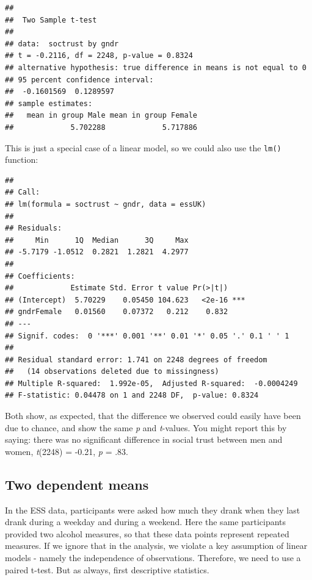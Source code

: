 \documentclass[
]{book}
\newenvironment{Shaded}{\begin{snugshade}}{\end{snugshade}}
\newcommand{\DataTypeTok}[1]{\textcolor[rgb]{0.13,0.29,0.53}{#1}}
\newcommand{\KeywordTok}[1]{\textcolor[rgb]{0.13,0.29,0.53}{\textbf{#1}}}
\newcommand{\NormalTok}[1]{#1}
\newcommand{\OperatorTok}[1]{\textcolor[rgb]{0.81,0.36,0.00}{\textbf{#1}}}
\newcommand{\StringTok}[1]{\textcolor[rgb]{0.31,0.60,0.02}{#1}}
\begin{document}
\begin{verbatim}
## 
## 	Two Sample t-test
## 
## data:  soctrust by gndr
## t = -0.2116, df = 2248, p-value = 0.8324
## alternative hypothesis: true difference in means is not equal to 0
## 95 percent confidence interval:
##  -0.1601569  0.1289597
## sample estimates:
##   mean in group Male mean in group Female 
##             5.702288             5.717886
\end{verbatim}

This is just a special case of a linear model, so we could also use the \texttt{lm()} function:

\begin{Shaded}
\end{Shaded}

\begin{verbatim}
## 
## Call:
## lm(formula = soctrust ~ gndr, data = essUK)
## 
## Residuals:
##     Min      1Q  Median      3Q     Max 
## -5.7179 -1.0512  0.2821  1.2821  4.2977 
## 
## Coefficients:
##             Estimate Std. Error t value Pr(>|t|)    
## (Intercept)  5.70229    0.05450 104.623   <2e-16 ***
## gndrFemale   0.01560    0.07372   0.212    0.832    
## ---
## Signif. codes:  0 '***' 0.001 '**' 0.01 '*' 0.05 '.' 0.1 ' ' 1
## 
## Residual standard error: 1.741 on 2248 degrees of freedom
##   (14 observations deleted due to missingness)
## Multiple R-squared:  1.992e-05,	Adjusted R-squared:  -0.0004249 
## F-statistic: 0.04478 on 1 and 2248 DF,  p-value: 0.8324
\end{verbatim}

Both show, as expected, that the difference we observed could easily have been due to chance, and show the same \emph{p} and \emph{t}-values. You might report this by saying: there was no significant difference in social trust between men and women, \emph{t}(2248) = -0.21, \emph{p} = .83.

\hypertarget{two-dependent-means}{%
\subsection{Two dependent means}\label{two-dependent-means}}

In the ESS data, participants were asked how much they drank when they last drank during a weekday and during a weekend. Here the same participants provided two alcohol measures, so that these data points represent repeated measures. If we ignore that in the analysis, we violate a key assumption of linear models - namely the independence of observations. Therefore, we need to use a paired t-test. But as always, first descriptive statistics.
\end{document}
